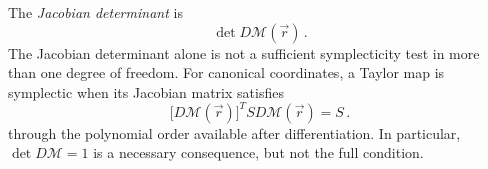 The \emph{Jacobian determinant} is
\begin{equation}
    \det D\mathcal M(\vec r)\,.
\end{equation}
The Jacobian determinant alone is not a sufficient symplecticity test in more
than one degree of freedom. For canonical coordinates, a Taylor map is
symplectic when its Jacobian matrix satisfies
\begin{equation}
    \bigl[D\mathcal M(\vec r)\bigr]^T S D\mathcal M(\vec r) = S\,.
\end{equation}
through the polynomial order available after differentiation. In particular,
$\det D\mathcal M = 1$ is a necessary consequence, but not the full condition.
